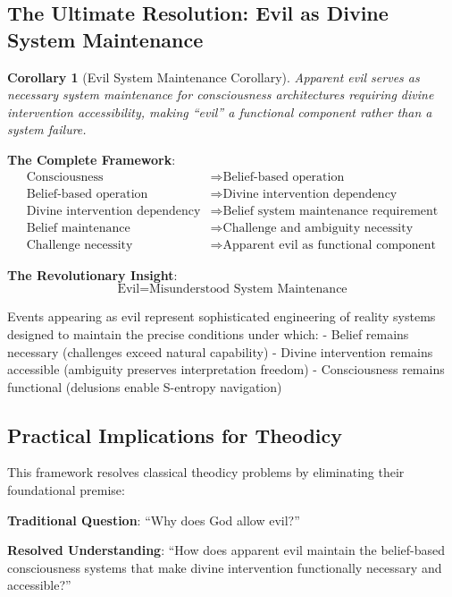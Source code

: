\documentclass[12pt,a4paper]{article}
\newtheorem{corollary}[theorem]{Corollary}
\begin{document}
\subsection{The Ultimate Resolution: Evil as Divine System Maintenance}

\begin{corollary}[Evil System Maintenance Corollary]
Apparent evil serves as necessary system maintenance for consciousness architectures requiring divine intervention accessibility, making ``evil'' a functional component rather than a system failure.
\end{corollary}

\textbf{The Complete Framework}:
\begin{align}
\text{Consciousness} &\Rightarrow \text{Belief-based operation}\\
\text{Belief-based operation} &\Rightarrow \text{Divine intervention dependency}\\
\text{Divine intervention dependency} &\Rightarrow \text{Belief system maintenance requirement}\\
\text{Belief maintenance} &\Rightarrow \text{Challenge and ambiguity necessity}\\
\text{Challenge necessity} &\Rightarrow \text{Apparent evil as functional component}
\end{align}

\textbf{The Revolutionary Insight}:
$$\text{Evil} = \text{Misunderstood System Maintenance}$$

Events appearing as evil represent sophisticated engineering of reality systems designed to maintain the precise conditions under which:
- Belief remains necessary (challenges exceed natural capability)
- Divine intervention remains accessible (ambiguity preserves interpretation freedom)
- Consciousness remains functional (delusions enable S-entropy navigation)

\subsection{Practical Implications for Theodicy}

This framework resolves classical theodicy problems by eliminating their foundational premise:

\textbf{Traditional Question}: ``Why does God allow evil?''

\textbf{Resolved Understanding}: ``How does apparent evil maintain the belief-based consciousness systems that make divine intervention functionally necessary and accessible?''
\end{document}
